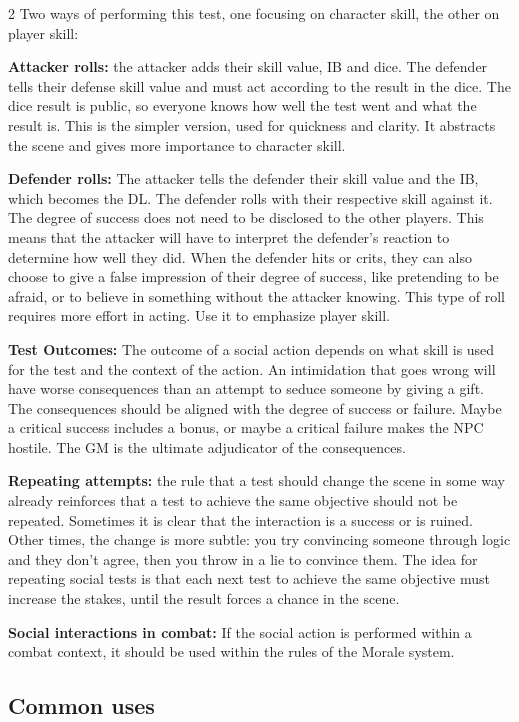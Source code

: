 \begin{multicols}{2}
Two ways of performing this test, one focusing on character skill, the other on player skill:

\textbf{Attacker rolls:} the attacker adds their skill value, IB and dice. The defender tells their defense skill value and must act according to the result in the dice. The dice result is public, so everyone knows how well the test went and what the result is. This is the simpler version, used for quickness and clarity. It abstracts the scene and gives more importance to character skill.

\textbf{Defender rolls:} The attacker tells the defender their skill value and the IB, which becomes the DL. The defender rolls with their respective skill against it. The degree of success does not need to be disclosed to the other players. This means that the attacker will have to interpret the defender's reaction to determine how well they did. When the defender hits or crits, they can also choose to give a false impression of their degree of success, like pretending to be afraid, or to believe in something without the attacker knowing. This type of roll requires more effort in acting. Use it to emphasize player skill.

\textbf{Test Outcomes:} The outcome of a social action depends on what skill is used for the test and the context of the action. An intimidation that goes wrong will have worse consequences than an attempt to seduce someone by giving a gift. The consequences should be aligned with the degree of success or failure. Maybe a critical success includes a bonus, or maybe a critical failure makes the NPC hostile. The GM is the ultimate adjudicator of the consequences.

\textbf{Repeating attempts:} the rule that a test should change the scene in some way already reinforces that a test to achieve the same objective should not be repeated. Sometimes it is clear that the interaction is a success or is ruined. Other times, the change is more subtle: you try convincing someone through logic and they don't agree, then you throw in a lie to convince them. The idea for repeating social tests is that each next test to achieve the same objective must increase the stakes, until the result forces a chance in the scene.

\textbf{Social interactions in combat:} If the social action is performed within a combat context, it should be used within the rules of the Morale system.

\subsection{Common uses}


\end{multicols}
